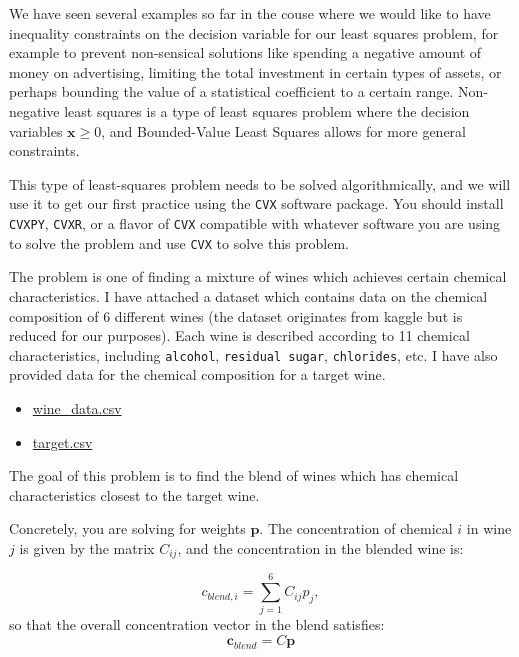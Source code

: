 \documentclass[
  letterpaper,
  DIV=11,
  numbers=noendperiod]{scrartcl}
\providecommand{\tightlist}{%
  \setlength{\itemsep}{0pt}\setlength{\parskip}{0pt}}\usepackage{longtable,booktabs,array}
\begin{document}
We have seen several examples so far in the couse where we would like to
have inequality constraints on the decision variable for our least
squares problem, for example to prevent non-sensical solutions like
spending a negative amount of money on advertising, limiting the total
investment in certain types of assets, or perhaps bounding the value of
a statistical coefficient to a certain range. Non-negative least squares
is a type of least squares problem where the decision variables
\(\mathbf{x}\geq 0\), and Bounded-Value Least Squares allows for more
general constraints.

This type of least-squares problem needs to be solved algorithmically,
and we will use it to get our first practice using the \texttt{CVX}
software package. You should install \texttt{CVXPY}, \texttt{CVXR}, or a
flavor of \texttt{CVX} compatible with whatever software you are using
to solve the problem and use \texttt{CVX} to solve this problem.

The problem is one of finding a mixture of wines which achieves certain
chemical characteristics. I have attached a dataset which contains data
on the chemical composition of 6 different wines (the dataset originates
from kaggle but is reduced for our purposes). Each wine is described
according to 11 chemical characteristics, including \texttt{alcohol},
\texttt{residual\ sugar}, \texttt{chlorides}, etc. I have also provided
data for the chemical composition for a target wine.

\begin{itemize}
\tightlist
\item
  \href{https://github.com/georgehagstrom/DATA609Spring2025/blob/main/website/assignments/labs/labData/wine_data.csv}{wine\_data.csv}
\item
  \href{https://github.com/georgehagstrom/DATA609Spring2025/blob/main/website/assignments/labs/labData/target.csv}{target.csv}
\end{itemize}

The goal of this problem is to find the blend of wines which has
chemical characteristics closest to the target wine.

Concretely, you are solving for weights \(\mathbf{p}\). The
concentration of chemical \(i\) in wine \(j\) is given by the matrix
\(C_{ij}\), and the concentration in the blended wine is:

\[
c_{blend,i} = \sum_{j=1}^6 C_{ij} p_j,
\] so that the overall concentration vector in the blend satisfies: \[
\mathbf{c}_{blend} = C\mathbf{p}
\]
\end{document}
